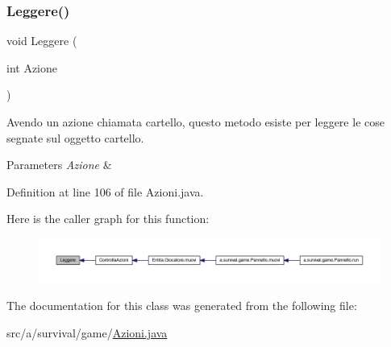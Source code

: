 \subsubsection{\texorpdfstring{Leggere()}{Leggere()}}
{\footnotesize\ttfamily void Leggere (\begin{DoxyParamCaption}\item[{int}]{Azione }\end{DoxyParamCaption})}



Avendo un azione chiamata cartello, questo metodo esiste per leggere le cose segnate sul oggetto cartello. 


\begin{DoxyParams}{Parameters}
{\em Azione} & \\
\hline
\end{DoxyParams}


Definition at line 106 of file Azioni.\+java.

Here is the caller graph for this function\+:
\nopagebreak
\begin{figure}[H]
\begin{center}
\leavevmode
\includegraphics[width=350pt]{classa_1_1survival_1_1game_1_1_azioni_a9ca19225b144750b819e59fece5ef1a7_icgraph}
\end{center}
\end{figure}


The documentation for this class was generated from the following file\+:\begin{DoxyCompactItemize}
\item 
src/a/survival/game/\hyperlink{_azioni_8java}{Azioni.\+java}\end{DoxyCompactItemize}
